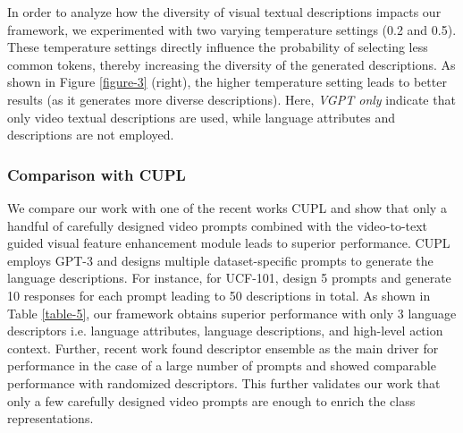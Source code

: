\documentclass{article} \usepackage{iclr2024_conference,times}
\begin{document}
In order to analyze how the diversity of visual textual descriptions impacts our framework, we experimented with two varying temperature settings (0.2 and 0.5). These temperature settings directly influence the probability of selecting less common tokens, thereby increasing the diversity of the generated descriptions. As shown in Figure \ref{figure-3} (right), the higher temperature setting leads to better results (as it generates more diverse descriptions). Here, \emph{VGPT only} indicate that only video textual descriptions are used, while language attributes and descriptions are not employed.



\subsubsection{Comparison with CUPL}
\label{Comparison with CUPL}
We compare our work with one of the recent works CUPL \citep{pratt2022does} and show that only a handful of carefully designed video prompts combined with the video-to-text guided visual feature enhancement module leads to superior performance. CUPL employs GPT-3 and designs multiple dataset-specific prompts to generate the language descriptions.  For instance, for UCF-101, \citep{pratt2022does} design 5 prompts and generate 10 responses for each prompt leading to 50 descriptions in total. As shown in Table \ref{table-5}, our framework obtains superior performance with only 3 language descriptors i.e. language attributes, language descriptions, and high-level action context.  Further, recent work \citep{roth2023waffling} found descriptor ensemble as the main driver for performance in the case of a large number of prompts and showed comparable performance with randomized descriptors. This further validates our work that only a few carefully designed video prompts are enough to enrich the class representations.
\end{document}
